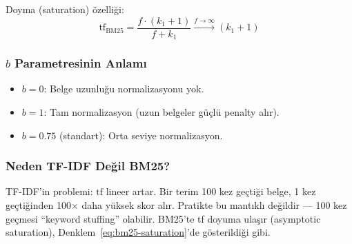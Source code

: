 \noindent
Doyma (saturation) \"{o}zelli\u{g}i:
\begin{equation}
\text{tf}_{\text{BM25}} = \frac{f \cdot (k_1 + 1)}{f + k_1} \xrightarrow{f \to \infty} (k_1 + 1)
\label{eq:bm25-saturation}
\end{equation}

\subsubsection{$b$ Parametresinin Anlam{\i}}

\begin{itemize}
  \item $b = 0$: Belge uzunlu\u{g}u normalizasyonu yok.
  \item $b = 1$: Tam normalizasyon (uzun belgeler g\"{u}\c{c}l\"{u} penalty al{\i}r).
  \item $b = 0.75$ (standart): Orta seviye normalizasyon.
\end{itemize}

\subsubsection{Neden TF-IDF De\u{g}il BM25?}

TF-IDF'in problemi: $\text{tf}$ lineer artar. Bir terim 100 kez ge\c{c}ti\u{g}i belge, 1 kez ge\c{c}ti\u{g}inden 100$\times$ daha y\"{u}ksek skor al{\i}r. Pratikte bu mant{\i}kl{\i} de\u{g}ildir --- 100 kez ge\c{c}mesi ``keyword stuffing'' olabilir. BM25'te tf doyuma ula\c{s}{\i}r (asymptotic saturation), Denklem~\eqref{eq:bm25-saturation}'de g\"{o}sterildi\u{g}i gibi.

